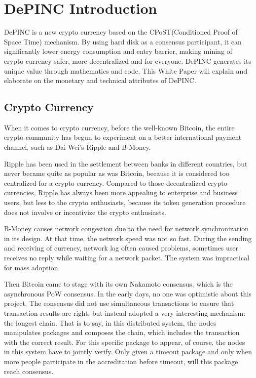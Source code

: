 \chapter{DePINC Introduction}
DePINC is a new crypto currency based on the CPoST(Conditioned Proof of Space Time) mechanism. By using hard disk as a consensus participant, it can significantly lower energy consumption and entry barrier, making mining of crypto currency safer, more decentralized and for everyone. DePINC generates its unique value through mathematics and code. This White Paper will explain and elaborate on the monetary and technical attributes of DePINC.
\section{Crypto Currency}
\begin{flushleft}
    When it comes to crypto currency, before the well-known Bitcoin, the entire crypto community has begun to experiment on a better international payment channel, such as Dai-Wei's Ripple and B-Money.
\end{flushleft}
\begin{flushleft}
    Ripple has been used in the settlement between banks in different countries, but never became quite as popular as was Bitcoin, because it is considered too centralized for a crypto currency. Compared to those decentralized crypto currencies, Ripple has always been more appealing to enterprise and business users, but less to the crypto enthusiasts, because its token generation procedure does not involve or incentivize the crypto enthusiasts.
\end{flushleft}
\begin{flushleft}
    B-Money causes network congestion due to the need for network synchronization in its design. At that time, the network speed was not so fast. During the sending and receiving of currency, network lag often caused problems, sometimes user receives no reply while waiting for a network packet. The system was impractical for mass adoption.
\end{flushleft}
\begin{flushleft}
    Then Bitcoin came to stage with its own Nakamoto consensus, which is the asynchronous PoW consensus. In the early days, no one was optimistic about this project. The consensus did not use simultaneous transactions to ensure that transaction results are right, but instead adopted a very interesting mechanism: the longest chain. That is to say, in this distributed system, the nodes manipulates packages and composes the chain, which includes the transaction with the correct result. For this specific package to appear, of course, the nodes in this system have to jointly verify. Only given a timeout package and only when more people participate in the accreditation before timeout, will this package reach consensus.
\end{flushleft}
